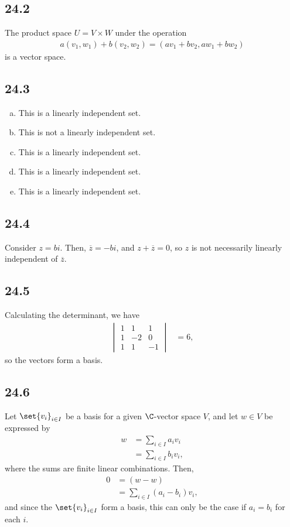 \documentclass[12pt]{mypackage}
\begin{document}
\subsection{24.2}%
The product space $U = V\times W$ under the operation
\begin{align*}
  a\left(v_1,w_1\right) + b\left(v_2,w_2\right) = \left(av_1 + bv_2,aw_1 + bw_2\right)
\end{align*}
is a vector space.
\subsection{24.3}%
\begin{enumerate}[(a)]
  \item This is a linearly independent set.
  \item This is not a linearly independent set.
  \item This is a linearly independent set.
  \item This is a linearly independent set.
  \item This is a linearly independent set.
\end{enumerate}
\subsection{24.4}%
Consider $z = bi$. Then, $\overline{z} = -bi$, and $z + \overline{z} = 0$, so $z$ is not necessarily linearly independent of $\overline{z}$.
\subsection{24.5}%
Calculating the determinant, we have
\begin{align*}
  \begin{vmatrix}1 & 1 & 1 \\ 1 & -2 & 0 \\ 1 & 1 & -1\end{vmatrix} &= 6,
\end{align*}
so the vectors form a basis.
\subsection{24.6}%
Let $\set{v_i}_{i\in I}$ be a basis for a given $\C$-vector space $V$, and let $w\in V$ be expressed by
\begin{align*}
  w &= \sum_{i\in I}a_iv_i\\
    &= \sum_{i\in I}b_iv_i,
\end{align*}
where the sums are finite linear combinations. Then,
\begin{align*}
  0 &= \left(w-w\right)\\
    &= \sum_{i\in I}\left(a_i-b_i\right)v_i,
\end{align*}
and since the $\set{v_i}_{i\in I}$ form a basis, this can only be the case if $a_i = b_i$ for each $i$.
\end{document}
